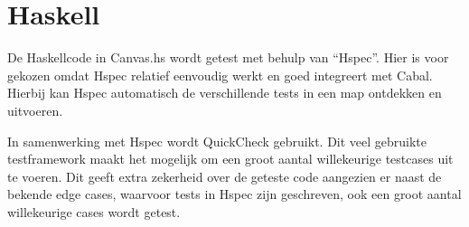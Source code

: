 \section{Haskell}
De Haskellcode in Canvas.hs wordt getest met behulp van ``Hspec''. Hier is voor gekozen omdat Hspec relatief eenvoudig werkt en goed integreert met Cabal. Hierbij kan Hspec automatisch de verschillende tests in een map ontdekken en uitvoeren.

In samenwerking met Hspec wordt QuickCheck gebruikt. Dit veel gebruikte testframework maakt het mogelijk om een groot aantal willekeurige testcases uit te voeren. Dit geeft extra zekerheid over de geteste code aangezien er naast de bekende edge cases, waarvoor tests in Hspec zijn geschreven, ook een groot aantal willekeurige cases wordt getest.